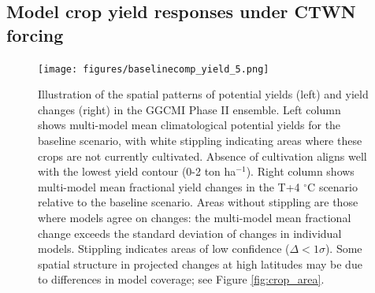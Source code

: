 \documentclass[gmd, manuscript]{copernicus} %
\begin{document}
\subsection{Model crop yield responses under CTWN forcing}
\begin{figure}[ht]
\centering
  \texttt{[image: figures/baselinecomp\_yield\_5.png]} 
  \caption{
  Illustration of the spatial patterns of potential yields (left) and yield changes (right) in the GGCMI Phase II ensemble. 
  Left column shows multi-model mean climatological potential yields for the baseline scenario, with white stippling indicating areas where these crops are not currently cultivated. 
  Absence of cultivation aligns well with the lowest yield contour (0-2 ton ha$^{-1}$). 
  Right column shows multi-model mean fractional yield changes in the T+4 $^{\circ}$C scenario relative to the baseline scenario. 
  Areas without stippling are those where models agree on changes: the multi-model mean fractional change exceeds the standard deviation of changes in individual models. 
  Stippling indicates areas of low confidence ($\Delta < 1 \sigma$). 
  Some spatial structure in projected changes at high latitudes may be due to differences in model coverage; see Figure \ref{fig:crop_area}.
  }
  \label{fig:maizesoybaseline}
\end{figure}
\end{document}
